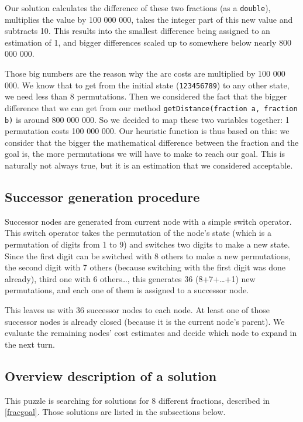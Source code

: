 \documentclass{article}
\begin{document}
Our solution calculates the difference of these two fractions (as a
\texttt{double}), multiplies the value by 100 000 000, takes the integer part of
this new value and subtracts 10.
This results into the smallest difference being assigned to an estimation of 1,
and bigger differences scaled up to somewhere below nearly 800 000 000.

Those big numbers are the reason why the arc costs are multiplied by 100 000
000.
We know that to get from the initial state (\texttt{123456789}) to any
other state, we need less than 8 permutations. Then we considered the fact that the
bigger difference that we can get from our method \texttt{getDistance(fraction
a, fraction b)} is around 800 000 000. So we decided to map these two variables
together: 1 permutation costs 100 000 000.
Our heuristic function is thus based on this: we consider that the bigger the
mathematical difference between the fraction and the goal is, the more
permutations we will have to make to reach our goal.
This is naturally not always true, but it is an estimation that we considered
acceptable.

\subsection{Successor generation procedure}

Successor nodes are generated from current node with a simple switch operator.
This switch operator takes the permutation of the node's state (which is a
permutation of digits from 1 to 9) and switches two digits to make a new state.
Since the first digit can be switched with 8 others to make a new permutations,
the second digit with 7 others (because switching with the first digit
was done already), third one with 6 others\ldots, this generates 36
(8+7+\ldots+1) new permutations, and each one of them is assigned to a successor
node.

This leaves us with 36 successor nodes to each node. At least one of those
successor nodes is already closed (because it is the current node's parent). We
evaluate the remaining nodes' cost estimates and decide which node to expand in
the next turn.

\subsection{Overview description of a solution}

This puzzle is searching for solutions for 8 different fractions, described in
\ref{fracgoal}.
Those solutions are listed in the subsections below.
\end{document}
